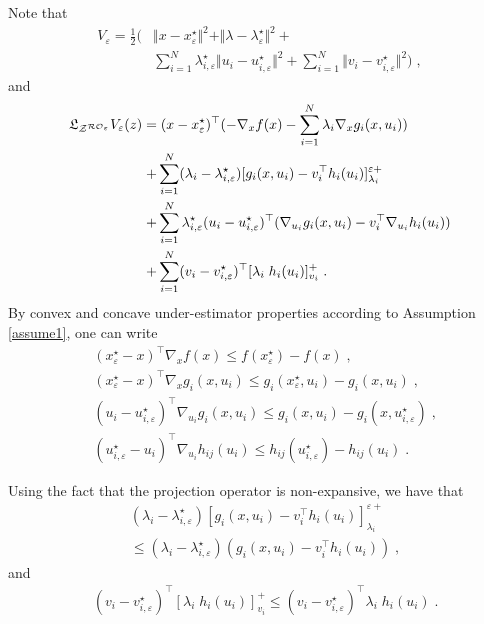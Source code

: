 \documentclass[journal,twoside,web]{ieeecolor}
\begin{document}
Note that
\begin{align}
V_\varepsilon=\frac{1}{2}\big(&\Vert x-x_\varepsilon^\star\Vert^2+\Vert \lambda-\lambda_\varepsilon^\star \Vert^2+\nonumber\\
&\sum_{i=1}^N\lambda_{i,\varepsilon}^\star \Vert u_i-u_{i,\varepsilon}^\star\Vert^2+ \sum_{i=1}^N\Vert v_i-v_{i,\varepsilon}^\star\Vert^2\big)\;, \label{Lya_function-pert}
\end{align}
and
\begin{align}
\mathfrak{L}_{{\cal Z}^{{\cal RO}_\varepsilon}}V_\varepsilon(z)=&\;(x-x_\varepsilon^\star)^\top(-\nabla_x f(x)-\sum_{i=1}^N\lambda_i \nabla_x g_i(x,u_i))\nonumber\\
+&\sum_{i=1}^N(\lambda_i-\lambda_{i,\varepsilon}^\star) [g_i(x,u_i)-v_i^\top h_i(u_i)]_{\lambda_i}^{\varepsilon+}\nonumber\\
+&\sum_{i=1}^N\lambda_{i,\varepsilon}^\star(u_i-u_{i,\varepsilon}^\star)^\top (\nabla_{u_i} g_i(x,u_i)-v_{i}^\top \nabla_{u_i} h_{i}(u_i))\nonumber\\
+&\sum_{i=1}^N (v_{i}-v_{i,\varepsilon}^\star)^\top [\lambda_i\; h_{i}(u_i)]_{v_{i}}^+\;.
\end{align}
By convex and concave under-estimator properties according to Assumption \ref{assume1}, one can write \cite[Section~3.1.3]{boyd2004}
\begin{align}
&(x_\varepsilon^\star-x)^\top \nabla_x f(x) \leq f(x_\varepsilon^\star)-f(x)\;,\label{under_estimator_1}\\
&(x_\varepsilon^\star-x)^\top \nabla_x g_i(x,u_i) \leq g_i(x_\varepsilon^\star,u_i)-g_i(x,u_i)\;,\label{under_estimator_2}\\
&(u_i-u_{i,\varepsilon}^\star)^\top \nabla_{u_i} g_i(x,u_i) \leq g_i(x,u_i)-g_i(x,u_{i,\varepsilon}^\star)\;,\label{under_estimator_3}\\
&(u_{i,\varepsilon}^\star-u_i)^\top \nabla_{u_i} h_{ij}(u_i) \leq h_{ij}(u_{i,\varepsilon}^\star)-h_{ij}(u_i)\;.\label{under_estimator_4}
\end{align}

Using the fact that the projection operator is non-expansive, we have that
\begin{align}
&(\lambda_i-\lambda_{i,\varepsilon}^\star) [g_i(x,u_i)-v_i^\top h_i(u_i)]_{\lambda_i}^{\varepsilon+} \nonumber\\
&\leq (\lambda_i-\lambda_{i,\varepsilon}^\star) (g_i(x,u_i)-v_i^\top h_i(u_i))\;,
\end{align}
and
\begin{align}
&(v_{i}-v_{i,\varepsilon}^\star)^\top [\lambda_i\; h_{i}(u_i)]_{v_i}^+
\leq(v_{i}-v_{i,\varepsilon}^\star)^\top \lambda_i\; h_{i}(u_i)\;.
\end{align}
\end{document}
